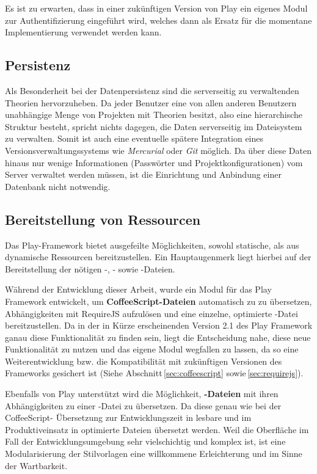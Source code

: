 Es ist zu erwarten, dass in einer zukünftigen Version von Play ein eigenes Modul zur
Authentifizierung eingeführt wird, welches dann als Ersatz für die momentane Implementierung
verwendet werden kann.

\subsection{Persistenz}

Als Besonderheit bei der Datenpersistenz sind die serverseitig zu verwaltenden Theorien
hervorzuheben. Da jeder Benutzer eine von allen anderen Benutzern unabhängige Menge von Projekten
mit Theorien besitzt, also eine hierarchische Struktur besteht, spricht nichts dagegen, die Daten
serverseitig im Dateisystem zu verwalten. Somit ist auch eine eventuelle spätere Integration eines
Versionsverwaltungssystems wie \textit{Mercurial} oder \textit{Git} möglich. Da über diese Daten
hinaus nur wenige Informationen (Passwörter und Projektkonfigurationen) vom Server verwaltet werden
müssen, ist die Einrichtung und Anbindung einer Datenbank nicht notwendig.

\subsection{Bereitstellung von Ressourcen}

Das Play-Framework bietet ausgefeilte Möglichkeiten, sowohl statische, als aus dynamische Ressourcen
bereitzustellen. Ein Hauptaugenmerk liegt hierbei auf der Bereitstellung der nötigen -,
- sowie -Dateien.

Während der Entwicklung dieser Arbeit, wurde ein Modul für das Play Framework entwickelt, um \textbf
{CoffeeScript-Dateien} automatisch zu  zu übersetzen, Abhängigkeiten mit RequireJS
aufzulösen und eine einzelne, optimierte -Datei bereitzustellen. Da in der in Kürze
erscheinenden Version 2.1 des Play Framework ganau diese Funktionalität zu finden sein, liegt die
Entscheidung nahe, diese neue Funktionalität zu nutzen und das eigene Modul wegfallen zu lassen, da
so eine Weiterentwicklung bzw. die Kompatibilität mit zukünftigen Versionen des Frameworks gesichert
ist (Siehe Abschnitt\,\ref{sec:coffeescript} sowie\,\ref{sec:requirejs}).

Ebenfalls von Play unterstützt wird die Möglichkeit, \textbf{-Dateien} mit ihren
Abhängigkeiten zu einer -Datei zu übersetzen. Da diese genau wie bei der CoffeeScript-
Übersetzung zur Entwicklungszeit in lesbare und im Produktiveinsatz in optimierte Dateien übersetzt
werden. Weil die Oberfläche im Fall der Entwicklungsumgebung sehr vielschichtig und komplex ist, ist
eine Modularisierung der Stilvorlagen eine willkommene Erleichterung und im Sinne der Wartbarkeit.

